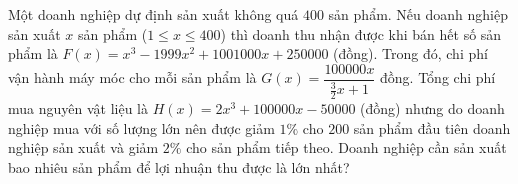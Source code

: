 \begin{ex}
Một doanh nghiệp dự định sản xuất không quá $400$ sản phẩm. Nếu doanh nghiệp sản xuất $x$ sản phẩm ($1\le x\le400$) thì doanh thu nhận được khi bán hết số sản phẩm là $F(x)=x^3-1999x^2+1001000x+250000$ (đồng). Trong đó, chi phí vận hành máy móc cho mỗi sản phẩm là $G(x)=\dfrac{100000x}{\frac32x+1}$ đồng. Tổng chi phí mua nguyên vật liệu là $H(x)=2x^3+100000x-50000$ (đồng) nhưng do doanh nghiệp mua với số lượng lớn nên được giảm $1\%$ cho $200$ sản phẩm đầu tiên doanh nghiệp sản xuất và giảm $2\%$ cho sản phẩm tiếp theo. Doanh nghiệp cần sản xuất bao nhiêu sản phẩm để lợi nhuận thu được là lớn nhất?
\end{ex}
